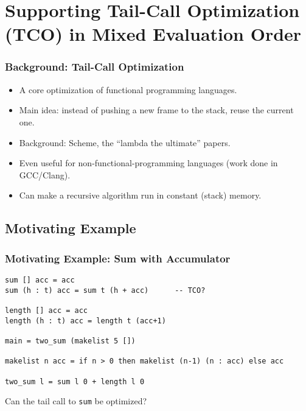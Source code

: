 \documentclass{beamer}
\begin{document}
\section{Supporting Tail-Call Optimization (TCO) in Mixed Evaluation Order}

\begin{frame}
  \frametitle{Background: Tail-Call Optimization}

  \begin{itemize}
  \item A core optimization of functional programming languages.
  \item Main idea: instead of pushing a new frame to the stack, reuse the current one.
  \item Background: Scheme, the ``lambda the ultimate'' papers.
  \item Even useful for non-functional-programming languages (work done in GCC/Clang).
  \item Can make a recursive algorithm run in constant (stack) memory.
  \end{itemize}
\end{frame}


\subsection{Motivating Example}

\begin{frame}[fragile]
  \frametitle{Motivating Example: Sum with Accumulator}
  \begin{block}{}
  {\small
\begin{verbatim}
sum [] acc = acc
sum (h : t) acc = sum t (h + acc)      -- TCO?

length [] acc = acc
length (h : t) acc = length t (acc+1)

main = two_sum (makelist 5 [])

makelist n acc = if n > 0 then makelist (n-1) (n : acc) else acc

two_sum l = sum l 0 + length l 0
\end{verbatim}
  }
  \end{block}

  Can the tail call to \texttt{sum} be optimized?\\


\end{frame}
\end{document}
